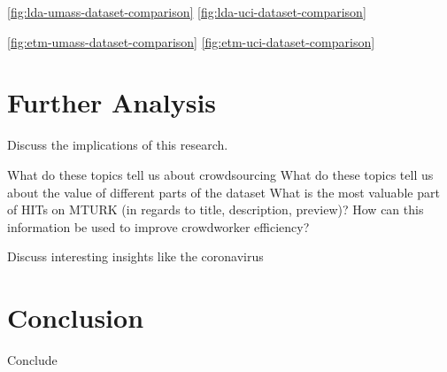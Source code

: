 \documentclass[letterpaper,12pt]{article}
\begin{document}
\ref{fig:lda-umass-dataset-comparison}
\ref{fig:lda-uci-dataset-comparison}

\ref{fig:etm-umass-dataset-comparison}
\ref{fig:etm-uci-dataset-comparison}



\chapter{Further Analysis}
Discuss the implications of this research.

What do these topics tell us about crowdsourcing
What do these topics tell us about the value of different parts of the dataset
What is the most valuable part of HITs on MTURK (in regards to title, description, preview)?
How can this information be used to improve crowdworker efficiency?

Discuss interesting insights like the coronavirus
\chapter{Conclusion}
Conclude



\end{document}
